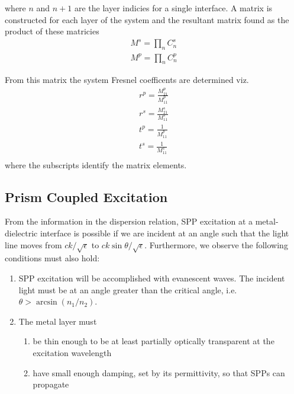 where $n$ and $n+1$ are the layer indicies for a single interface.  A
matrix is constructed for each layer of the system and the resultant matrix
found as the product of these matricies
\begin{align}
M^s=\prod_n C^s_n\\
M^p=\prod_n C^p_n
\end{align}

From this matrix the system Fresnel coefficents are determined viz.
\begin{align}
r^p = \frac{M^p_{21}}{M^p_{11}}\\
r^s = \frac{M^s_{21}}{M^s_{11}}\\
t^p = \frac{1}{M^p_{11}}\\
t^s = \frac{1}{M^s_{11}}\\
\end{align}
where the subscripts identify the matrix elements.

\subsection{Prism Coupled Excitation}
From the information in the dispersion relation, SPP excitation at a
metal-dielectric interface is possible if we are incident at an angle such
that the light line moves from $ck/\sqrt{\epsilon}$ to
$ck\sin\theta/\sqrt{\epsilon}$.  Furthermore, we observe the following
conditions must also hold:
\begin{enumerate}
\item SPP excitation will be accomplished with evanescent waves.  The
incident light must be at an angle greater than the critical angle, i.e.
$\theta>\arcsin\left(n_1/n_2\right)$.
\item The metal layer must
\begin{enumerate}
\item be thin enough to be at least partially optically transparent at the excitation wavelength
\item have small enough damping, set by its permittivity, so that SPPs can propagate
\end{enumerate}
\end{enumerate}

